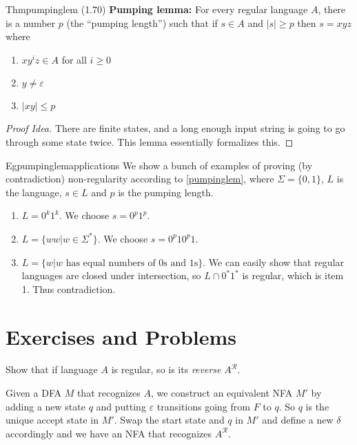 \begin{reference}{Thm}{pumpinglem}
  (1.70) \textbf{Pumping lemma:} For every regular language $A$, there is a number $p$ (the ``pumping length'') such that if $s\in A$ and $|s|\geq p$ then $s=xyz$ where
  \begin{enumerate}
    \item $xy^iz\in A$ for all $i\geq0$
    \item $y\neq \varepsilon$
    \item $|xy|\leq p$\qedhere
  \end{enumerate}
\end{reference}

\begin{proof}[Proof Idea]
  There are finite states, and a long enough input string is going to go through some state twice. This lemma essentially formalizes this.
\end{proof}

\begin{reference}{Eg}{pumpinglemapplications}
  We show a bunch of examples of proving (by contradiction) non-regularity according to \ref{pumpinglem}, where $\Sigma=\{0,1\}$, $L$ is the language, $s\in L$ and $p$ is the pumping length.
  \begin{enumerate}
    \item $L=0^k1^k$. We choose $s=0^p1^p$.
    \item $L=\{ww|w\in \Sigma^*\}$. We choose $s=0^p10^p1$.
    \item $L=\{w|w\text{ has equal numbers of $0$s and $1$s}\}$. We can easily show that regular languages are closed under intersection, so $L\cap 0^*1^*$ is regular, which is item 1. Thus contradiction.\qedhere
  \end{enumerate}
\end{reference}

\section*{Exercises and Problems}

\setcounter{exercise}{30}

\begin{exercise}
  Show that if language $A$ is regular, so is its \textit{reverse} $A^{\mathcal{R}}$.
\end{exercise}

Given a DFA $M$ that recognizes $A$, we construct an equivalent NFA $M'$ by adding a new state $q$ and putting $\varepsilon$ transitions going from $F$ to $q$. So $q$ is the unique accept state in $M'$. Swap the start state and $q$ in $M'$ and define a new $\delta$ accordingly and we have an NFA that recognizes $A^{\mathcal{R}}$.

